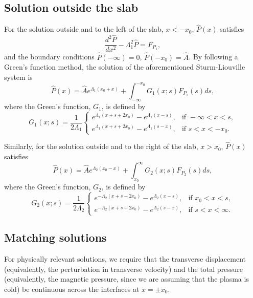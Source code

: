 \documentclass{aastex61}
\begin{document}
\subsection{Solution outside the slab}
For the solution outside and to the left of the slab, $x < -x_0$, $\hat{P}(x)$ satisfies
\begin{equation}
\frac{d^2\hat{P}}{dx^2} - \Lambda_1^2 \hat{P} = F_{P_1},
\end{equation}
and the boundary conditions $\hat{P}(-\infty) = 0$, $\hat{P}(-x_0) = \hat{A}$. By following a Green's function method, the solution of the aforementioned Sturm-Liouville system is
\begin{equation}
\hat{P}(x) = \hat{A}e^{\Lambda_1(x_0+x)} + \int_{-\infty}^{-x_0} G_1(x;s) F_{P_1}(s) ds,
\label{P sol 1}
\end{equation}
where the Green's function, $G_1$, is defined by
\begin{equation}
G_1(x;s) = \frac{1}{2\Lambda_1}
\begin{cases}
e^{\Lambda_1(x+s+2x_0)} - e^{\Lambda_1(x-s)}, & \text{if } -\infty<x<s, \\
e^{\Lambda_1(x+s+2x_0)} - e^{\Lambda_1(s-x)}, & \text{if } s<x<-x_0.
\end{cases}
\end{equation}

Similarly, for the solution outside and to the right of the slab, $x > x_0$, $\hat{P}(x)$ satisfies
\begin{equation}
\hat{P}(x) = \hat{A}e^{\Lambda_2(x_0-x)} + \int_{x_0}^{\infty} G_2(x;s) F_{P_2}(s) ds,
\label{P sol 2}
\end{equation}
where the Green's function, $G_2$, is defined by
\begin{equation}
G_2(x;s) = \frac{1}{2\Lambda_2}
\begin{cases}
e^{-\Lambda_2(x+s-2x_0)} - e^{\Lambda_2(x-s)}, & \text{if } x_0<x<s, \\
e^{-\Lambda_2(x+s+2x_0)} - e^{\Lambda_2(s-x)}, & \text{if } s<x<\infty.
\end{cases}
\end{equation}


\subsection{Matching solutions}
For physically relevant solutions, we require that the transverse displacement (equivalently, the perturbation in transverse velocity) and the total pressure (equivalently, the magnetic pressure, since we are assuming that the plasma is cold) be continuous across the interfaces at $x = \pm x_0$.
\end{document}
